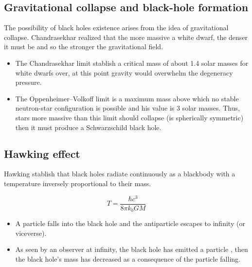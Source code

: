 \documentclass[letterpaper,11pt,onecolumn]{article}
\begin{document}
\subsection{Gravitational collapse and black-hole formation}
The possibility of black holes existence arises from the idea of gravitational collapse. Chandrasekhar realized that the more massive a white dwarf, the denser it must be and so the stronger the gravitational field. \begin{itemize}
    \item The Chandrasekhar limit stablish a
critical mass of about 1.4 solar masses for white dwarfs over, at this point gravity would
overwhelm the degeneracy pressure.
\item The Oppenheimer–Volkoff limit is a maximum mass above which no stable neutron-star configuration is possible and his value is $3$ solar masses. Thus, stars more massive than this limit should collapse (is spherically symmetric) then it must produce a Schwarzschild black hole.
\end{itemize}

\subsection{Hawking effect}
Hawking stablish that black holes radiate
continuously as a blackbody with a temperature inversely proportional to their mass.

\begin{equation}
    T=\frac{\hbar c^3}{8\pi k_b G M}
\end{equation}
\begin{itemize}
    \item A particle falls into the black hole and the antiparticle escapes to infinity (or viceverse).
    \item As seen by an observer at infinity, the black hole has emitted a particle , then the black hole’s mass has decreased as a consequence of the particle falling.\textbf{}
\end{itemize}



\printbibliography
\end{document}
